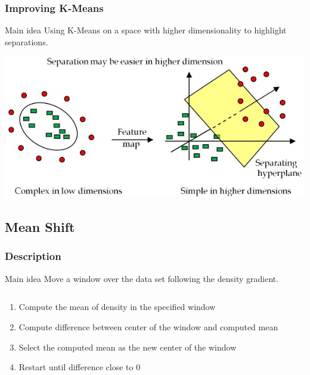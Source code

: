 \documentclass[10p]{beamer}
\begin{document}
\begin{frame}
{\begin{columns}
\begin{column}{0.5\textwidth}
\end{column}
\end{columns}
}
\end{frame}
\begin{frame}
\frametitle{Improving K-Means}
\begin{block}{Main idea}
Using K-Means on a space with higher dimensionality to highlight separations.
\end{block}
\includegraphics[width=\columnwidth]{Image/separation.jpeg}
\end{frame}
\subsection{Mean Shift}
\begin{frame}
\frametitle{Description}
\begin{block}{Main idea}
Move a window over the data set following the density gradient.
\end{block}
\begin{columns}
\begin{column}{0.6\textwidth}
\begin{enumerate}
\item Compute the mean of density in the specified window
\item Compute difference between center of the window and computed mean
\item Select the computed mean as the new center of the window
\item Restart until difference close to 0
\end{enumerate}
\end{column}
\begin{column}{0.4\textwidth}
\end{column}
\end{columns}
\end{frame}
\end{document}
